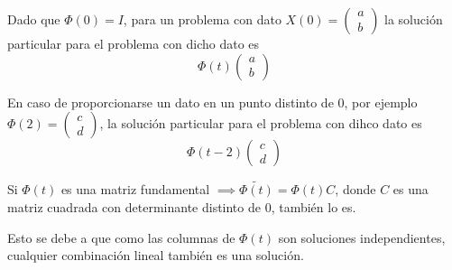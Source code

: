 \documentclass{mathnotes}
\begin{document}
\obs
Dado que $\Phi(0) = I$, para un problema con dato $X(0) = \begin{pmatrix}
a\\b
\end{pmatrix}$ la solución particular para el problema con dicho dato es $$\Phi(t)\begin{pmatrix}
a\\b
\end{pmatrix}$$

En caso de proporcionarse un dato en un punto distinto de $0$, por ejemplo $\Phi(2) = \begin{pmatrix}
c\\d
\end{pmatrix}$, la solución particular para el problema con dihco dato es
$$\Phi(t-2)\begin{pmatrix}
c\\d
\end{pmatrix}$$

\obs
Si $\Phi(t)$ es una matriz fundamental $\implies \tilde{\Phi(t)} = \Phi(t)C$, donde $C$ es una matriz cuadrada con determinante distinto de $0$, también lo es.

Esto se debe a que como las columnas de $\Phi(t)$ son soluciones independientes, cualquier combinación lineal también es una solución.
\end{document}
